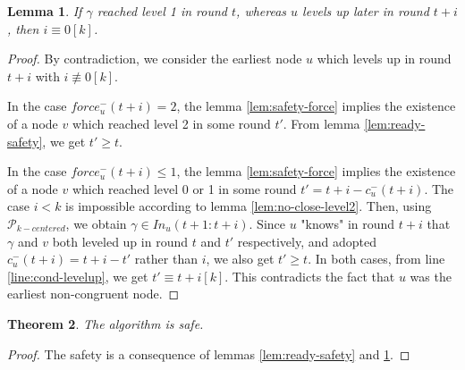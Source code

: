 \documentclass[11pt,letterpaper]{article}
\newtheorem{thm}{Theorem}
\newtheorem{lem}[thm]{Lemma}
\newcommand{\cent}{\gamma}
\begin{document}
\begin{lem} \label{lem:later-level1}
	If $\cent$ reached level 1 in round $t$, whereas $u$ levels up later in round $t+i$, then $i \equiv 0 [k]$. 
\end{lem}
\begin{proof}
	By contradiction, we consider the earliest node $u$ which levels up in round $t+i$ with $i \not\equiv 0 [k]$.

	In the case $force_u^-(t+i) = 2$, the lemma \ref{lem:safety-force} implies the existence of a node $v$ which reached level 2 in some round $t'$. 
	From lemma \ref{lem:ready-safety}, we get $t' \geq t$.

	In the case $force_u^-(t+i) \leq 1$, the lemma \ref{lem:safety-force} implies the existence of a node $v$ which reached level 0 or 1 in some round $t' = t+i-c_u^-(t+i)$. 
	The case $i < k$ is impossible according to lemma \ref{lem:no-close-level2}.
	Then, using $\mathcal{P}_{k-centered}$, we obtain $\cent \in In_u(t+1:t+i)$.
	Since $u$ "knows" in round $t+i$ that $\cent$ and $v$ both leveled up in round $t$ and $t'$ respectively, and adopted $c_u^-(t+i) = t+i-t'$ rather than $i$,
	we also get $t' \geq t$.
	In both cases, from line \ref{line:cond-levelup}, we get $t' \equiv t+i [k]$.
	This contradicts the fact that $u$ was the earliest non-congruent node.
\end{proof}

\begin{thm} \label{lem:safety} 
	The algorithm is safe.
\end{thm}
\begin{proof}
	The safety is a consequence of lemmas \ref{lem:ready-safety} and \ref{lem:later-level1}.
\end{proof}
\end{document}
